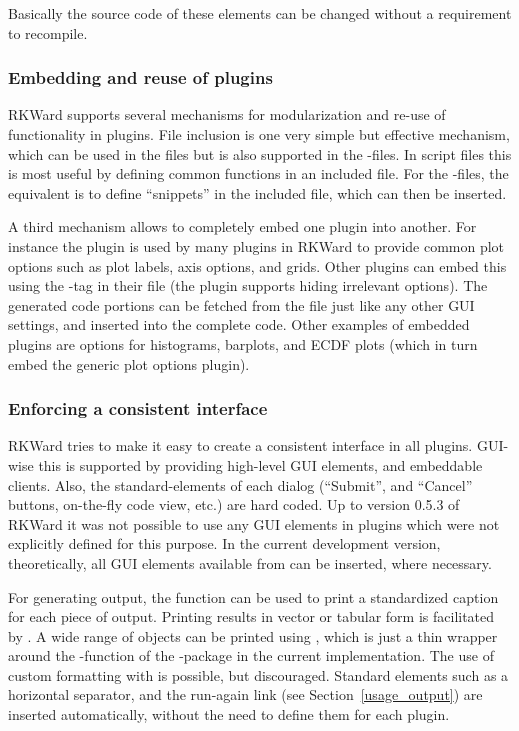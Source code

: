 Basically the source code of these elements can be changed without a requirement to recompile.

\subsubsection[technical_plugins_embedding]{Embedding and reuse of plugins}
RKWard supports several mechanisms for modularization and re-use of
functionality in plugins. File inclusion is one very simple but effective
mechanism, which can be used in the  files but is also supported in
the -files. In script files this is most useful by defining common functions
in an included file. For the -files, the equivalent is to define ``snippets''
in the included file, which can then be inserted.

A third mechanism allows to completely embed one plugin into another. For
instance the  plugin is used by many plugins in RKWard to provide
common plot options such as plot labels, axis options, and grids. Other plugins
can embed this using the -tag in their  file (the plugin supports
hiding irrelevant options). The generated code portions can be fetched from the
 file just like any other GUI settings, and inserted into the complete
code. Other examples of embedded plugins are options for histograms, barplots,
and ECDF plots (which in turn embed the generic plot options plugin).

\subsubsection[technical_plugins_consistency]{Enforcing a consistent interface}
RKWard tries to make it easy to create a consistent interface in all plugins.
GUI-wise this is supported by providing high-level GUI elements, and embeddable
clients. Also, the standard-elements of each dialog (``Submit'', and
``Cancel'' buttons, on-the-fly code view, etc.) are hard coded. Up to version
0.5.3 of RKWard it was not possible to use any GUI elements in plugins which
were not explicitly defined for this purpose. In the current development
version, theoretically, all GUI elements available from  can be inserted,
where necessary.

For generating output, the function  can be used to print a
standardized caption for each piece of output. Printing results in vector or
tabular form is facilitated by . A wide range of objects can be
printed using , which is just a thin wrapper around the
-function of the -package \citep{Lecoutre2003} in the current
implementation. The use of custom formatting with  is possible, but
discouraged. Standard elements such as a horizontal separator, and the run-again
link (see Section~\ref{usage_output}) are inserted automatically, without the need to define
them for each plugin.

